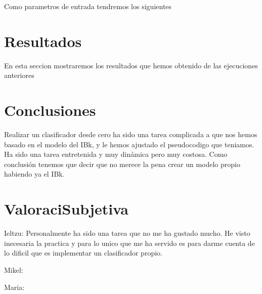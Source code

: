 \documentclass[a4paper,10pt]{article}
\theoremstyle{plain}
\begin{document}
	Como parametros de entrada tendremos los siguientes


\section{Resultados}

En esta seccion mostraremos los resultados que hemos obtenido de las ejecuciones anteriores

\section{Conclusiones}

Realizar un clasificador desde cero ha sido una tarea complicada a que nos hemos basado en el modelo del IBk, y le hemos ajustado el pseudocodigo que teniamos. Ha sido una tarea entretenida y muy din\'amica pero muy costosa. Como conclusi\'on tenemos que decir que no merece la pena crear un modelo propio habiendo ya el IBk.   

\section{Valoraci\on Subjetiva}

Ieltzu: Personalmente ha sido una tarea que no me ha gustado mucho. He visto inecesaria la practica y para lo unico que me ha servido es para darme cuenta de lo dificil que es implementar un clasificador propio. 

Mikel:

Maria:





\end{document}
